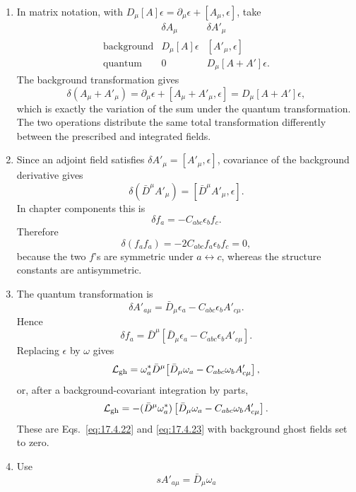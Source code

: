 \begin{enumerate}
  \begin{enumerate}
    \item[(a)]
    In matrix notation, with \(D_\mu[A]\epsilon
    =\partial_\mu\epsilon+[A_\mu,\epsilon]\), take
    \[
    \begin{array}{c|cc}
       &\delta A_\mu&\delta A'_\mu\\ \hline
      \text{background}
        &D_\mu[A]\epsilon&[A'_\mu,\epsilon]\\
      \text{quantum}
        &0&D_\mu[A+A']\epsilon .
    \end{array}
    \]
    The background transformation gives
    \[
      \delta(A_\mu+A'_\mu)
        =\partial_\mu\epsilon+[A_\mu+A'_\mu,\epsilon]
        =D_\mu[A+A']\epsilon ,
    \]
    which is exactly the variation of the sum under the quantum
    transformation.  The two operations distribute the same total
    transformation differently between the prescribed and integrated
    fields.
    \item[(b)]
    Since an adjoint field satisfies
    \(\delta A'_\mu=[A'_\mu,\epsilon]\), covariance of the background
    derivative gives
    \[
      \delta(\bar D^\mu A'_\mu)
        =[\bar D^\mu A'_\mu,\epsilon].
    \]
    In chapter components this is
    \[
      \delta f_a
        =-C_{abc}\epsilon_b f_c .
    \]
    Therefore
    \[
      \delta(f_a f_a)
        =-2C_{abc}
          f_a\epsilon_b f_c=0,
    \]
    because the two \(f\)'s are symmetric under
    \(a\leftrightarrow c\), whereas the structure constants are
    antisymmetric.
    \item[(c)]
    The quantum transformation is
    \[
      \delta A'_{a\mu}
        =\bar D_\mu\epsilon_a
         -C_{abc}\epsilon_b A'_{c\mu}.
    \]
    Hence
    \[
      \delta f_a
        =\bar D^\mu\!\left[
          \bar D_\mu\epsilon_a
          -C_{abc}\epsilon_b A'_{c\mu}\right].
    \]
    Replacing \(\epsilon\) by \(\omega\) gives
    \[
      \mathcal L_{\rm gh}
        =\omega_a^*\bar D^\mu\!\left[
          \bar D_\mu\omega_a
          -C_{abc}\omega_b A'_{c\mu}\right],
    \]
    or, after a background-covariant integration by parts,
    \[
      \mathcal L_{\rm gh}
        =-(\bar D^\mu\omega_a^*)
         \left[\bar D_\mu\omega_a
         -C_{abc}\omega_b A'_{c\mu}\right].
    \]
    These are Eqs.~\eqref{eq:17.4.22} and \eqref{eq:17.4.23} with
    background ghost fields set to zero.
    \item[(d)]
    Use
    \[
      sA'_{a\mu}
        =\bar D_\mu\omega_a
\]
\end{enumerate}
\end{enumerate}
